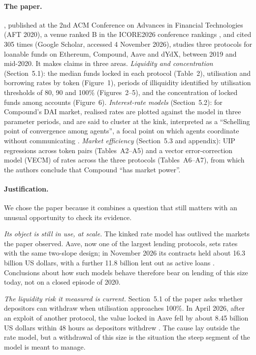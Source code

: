 \documentclass[11pt]{article}
\begin{document}
\paragraph{The paper.} \citet{gudgeon2020defi}, published at the 2nd ACM Conference on Advances in Financial Technologies (AFT 2020), a venue ranked B in the ICORE2026 conference rankings \citep{icore2026aft}, and cited 305 times (Google Scholar, accessed 4 November 2026), studies three protocols for loanable funds on Ethereum, Compound, Aave and dYdX, between 2019 and mid-2020. It makes claims in three areas. \emph{Liquidity and concentration} (Section~5.1): the median funds locked in each protocol (Table~2), utilisation and borrowing rates by token (Figure~1), periods of illiquidity identified by utilisation thresholds of 80, 90 and 100\% (Figures~2--5), and the concentration of locked funds among accounts (Figure~6). \emph{Interest-rate models} (Section~5.2): for Compound's DAI market, realised rates are plotted against the model in three parameter periods, and are said to cluster at the kink, interpreted as a ``Schelling point of convergence among agents'', a focal point on which agents coordinate without communicating \citep{schelling1960strategy}. \emph{Market efficiency} (Section~5.3 and appendix): UIP regressions across token pairs (Tables~A2--A5) and a vector error-correction model (VECM) of rates across the three protocols (Tables~A6--A7), from which the authors conclude that Compound ``has market power''.

\paragraph{Justification.} We chose the paper because it combines a question that still matters with an unusual opportunity to check its evidence.

\emph{Its object is still in use, at scale.} The kinked rate model has outlived the markets the paper observed. Aave, now one of the largest lending protocols, sets rates with the same two-slope design; in November 2026 its contracts held about 16.3 billion US dollars, with a further 11.8 billion lent out as active loans \citep{defillama2026aave}. Conclusions about how such models behave therefore bear on lending of this size today, not on a closed episode of 2020.

\emph{The liquidity risk it measured is current.} Section~5.1 of the paper asks whether depositors can withdraw when utilisation approaches 100\%. In April 2026, after an exploit of another protocol, the value locked in Aave fell by about 8.45 billion US dollars within 48 hours as depositors withdrew \citep{reynolds2026defi}. The cause lay outside the rate model, but a withdrawal of this size is the situation the steep segment of the model is meant to manage.
\end{document}
